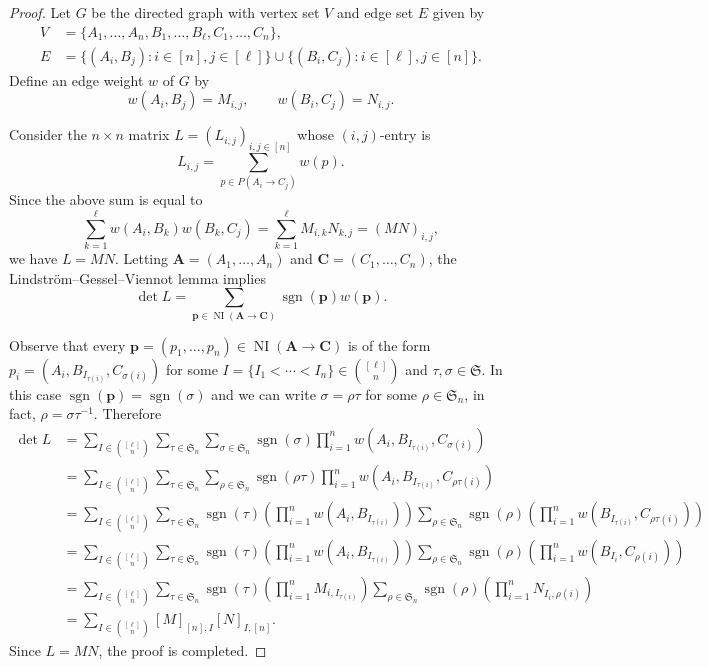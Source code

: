 \documentclass[oneside]{book}
\numberwithin{equation}{section}
\theoremstyle{definition}
\newcommand\NI{\operatorname{NI}}
\newcommand\sgn{\operatorname{sgn}}
\newcommand\sym{\mathfrak{S}}
\renewcommand\vec[1]{\bm{#1}}
\begin{document}
\begin{proof}
Let \( G \) be the directed graph with vertex set \( V \)
and edge set \( E \) given by
\begin{align*}
  V &= \{A_1,\dots,A_n, B_1,\dots,B_\ell, C_1,\dots,C_n\}, \\
  E &= \{(A_i,B_j): i\in [n], j\in [\ell]\} \cup
      \{(B_i,C_j): i\in [\ell], j\in [n]\}.
\end{align*}
Define an edge weight \( w \) of \( G \) by
\[
  w(A_i,B_j) = M_{i,j}, \qquad w(B_i,C_j) = N_{i,j}.
\]

Consider the \( n\times n \) matrix \( L=(L_{i,j})_{i,j\in[n]} \)
whose \( (i,j) \)-entry is
\[
  L_{i,j} = \sum_{p\in P(A_i\to C_j)} w(p).
\]
Since the above sum is equal to
\[
    \sum_{k=1}^{\ell} w(A_i,B_k) w(B_k,C_j)
  = \sum_{k=1}^{\ell} M_{i,k} N_{k,j} = (MN)_{i,j},
\]
we have \( L = MN \). Letting \( \vec A = (A_1,\dots,A_n) \) and
\( \vec C = (C_1,\dots,C_n) \), the Lindstr\"om--Gessel--Viennot lemma
implies
\[
  \det L = \sum_{\vec p\in \NI(\vec A \to \vec C)} 
  \sgn(\vec p) w(\vec p).
\]

Observe that every
\( \vec p = (p_1,\dots,p_{n})\in \NI(\vec A \to \vec C) \) is of the
form \( p_i = (A_i, B_{I_{\tau(i)}}, C_{\sigma(i)}) \) for some
\( I = \{I_1 < \cdots <I_n\}\in \binom{[\ell]}{n} \) and
\( \tau,\sigma\in \sym \). In this case
\( \sgn(\vec p) = \sgn(\sigma) \) and we can write
\( \sigma=\rho\tau \) for some \( \rho\in \sym_n \), in fact,
\( \rho = \sigma\tau^{-1} \).
Therefore
\begin{align*}
  \det L
  &= \sum_{I\in \binom{[\ell]}{n}} \sum_{\tau\in\sym_n} \sum_{\sigma\in\sym_n}  \sgn(\sigma) \prod_{i=1}^{n} w(A_i,B_{I_{\tau(i)}}, C_{\sigma(i)})\\
  &= \sum_{I\in \binom{[\ell]}{n}} \sum_{\tau\in\sym_n} \sum_{\rho\in\sym_n}  \sgn(\rho\tau) \prod_{i=1}^{n} w(A_i,B_{I_{\tau(i)}}, C_{\rho\tau(i)})\\
  &= \sum_{I\in \binom{[\ell]}{n}} \sum_{\tau\in\sym_n} \sgn(\tau) \left( \prod_{i=1}^{n} w(A_i,B_{I_{\tau(i)}}) \right)
    \sum_{\rho\in\sym_n}  \sgn(\rho) \left( \prod_{i=1}^{n} w(B_{I_{\tau(i)}}, C_{\rho\tau(i)}) \right)\\
  &= \sum_{I\in \binom{[\ell]}{n}} \sum_{\tau\in\sym_n} \sgn(\tau) \left( \prod_{i=1}^{n} w(A_i,B_{I_{\tau(i)}}) \right)
    \sum_{\rho\in\sym_n}  \sgn(\rho) \left( \prod_{i=1}^{n} w(B_{I_i}, C_{\rho(i)}) \right)\\
  &= \sum_{I\in \binom{[\ell]}{n}} \sum_{\tau\in\sym_n} \sgn(\tau) \left( \prod_{i=1}^{n} M_{i,I_{\tau(i)}} \right)
    \sum_{\rho\in\sym_n}  \sgn(\rho) \left( \prod_{i=1}^{n} N_{I_i,\rho(i)} \right)\\
  &= \sum_{I\in \binom{[\ell]}{n}} [M]_{[n],I} [N]_{I,[n]}.
\end{align*}
Since \( L=MN \), the proof is completed.
\end{proof}
\end{document}
